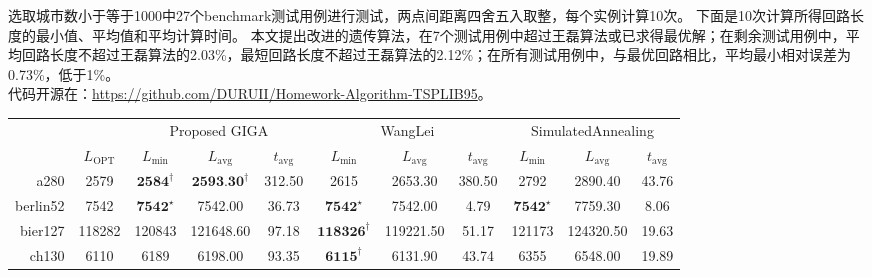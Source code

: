 \documentclass[12pt]{ctexart}
\begin{document}
选取城市数小于等于1000中27个benchmark测试用例进行测试，两点间距离四舍五入取整，每个实例计算10次。
下面是10次计算所得回路长度的最小值、平均值和平均计算时间。
本文提出改进的遗传算法，在7个测试用例中超过王磊算法或已求得最优解；在剩余测试用例中，平均回路长度不超过王磊算法的2.03\%，最短回路长度不超过王磊算法的2.12\%；在所有测试用例中，与最优回路相比，平均最小相对误差为0.73\%，低于1\%。\\[1em]

代码开源在：\url{https://github.com/DURUII/Homework-Algorithm-TSPLIB95}。

\begin{table}[htbp]
    \scriptsize
    \centering
    \begin{tabular}{rcccccccccc}
        \toprule
                 &                  & \multicolumn{3}{c}{Proposed GIGA} & \multicolumn{3}{c}{WangLei} & \multicolumn{3}{c}{SimulatedAnnealing}                                                                                                                               \\
        \cmidrule(l){3-5} \cmidrule(l){6-8} \cmidrule(l){9-11}
                 & $L_{\text{OPT}}$ & $L_{\min}$                        & $L_{\text{avg}}$            & $t_{\text{avg}}$                       & $L_{\min}$              & $L_{\text{avg}}$ & $t_{\text{avg}}$ & $L_{\min}$            & $L_{\text{avg}}$ & $t_{\text{avg}}$ \\
        \midrule
        a280     & 2579             & $\textbf{2584}^\dag$              & $\textbf{2593.30}^\dag$     & 312.50                                 & 2615                    & 2653.30          & 380.50           & 2792                  & 2890.40          & 43.76            \\
        berlin52 & 7542             & $\textbf{7542}^\star$             & 7542.00                     & 36.73                                  & $\textbf{7542}^\star$   & 7542.00          & 4.79             & $\textbf{7542}^\star$ & 7759.30          & 8.06             \\
        bier127  & 118282           & 120843                            & 121648.60                   & 97.18                                  & $\textbf{118326}^\dag$  & 119221.50        & 51.17            & 121173                & 124320.50        & 19.63            \\
        ch130    & 6110             & 6189                              & 6198.00                     & 93.35                                  & $\textbf{6115}^\dag$    & 6131.90          & 43.74            & 6355                  & 6548.00          & 19.89            \\

\end{tabular}
\end{table}
\end{document}
